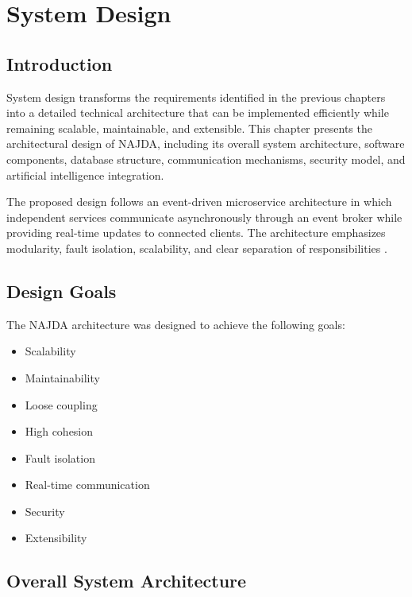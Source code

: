 \chapter{System Design}
\label{chap:system_design}

\section{Introduction}

System design transforms the requirements identified in the previous chapters into a detailed technical architecture that can be implemented efficiently while remaining scalable, maintainable, and extensible. This chapter presents the architectural design of NAJDA, including its overall system architecture, software components, database structure, communication mechanisms, security model, and artificial intelligence integration.

The proposed design follows an event-driven microservice architecture in which independent services communicate asynchronously through an event broker while providing real-time updates to connected clients. The architecture emphasizes modularity, fault isolation, scalability, and clear separation of responsibilities \cite{newman2021microservices,richardson2018microservices,bass2022software}.


\section{Design Goals}

The NAJDA architecture was designed to achieve the following goals:

\begin{itemize}
    \item Scalability
    \item Maintainability
    \item Loose coupling
    \item High cohesion
    \item Fault isolation
    \item Real-time communication
    \item Security
    \item Extensibility
\end{itemize}


\section{Overall System Architecture}

